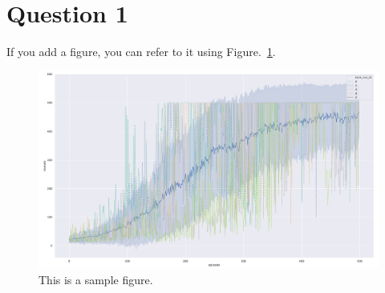 \documentclass[12pt]{article}
\begin{document}
\section{Question 1}

If you add a figure, you can refer to it using Figure.~\ref*{fig:fig1}.

\begin{figure}[h] 
	\centering  %
    \includegraphics[width=0.9\columnwidth]{img/training.pdf}
	\caption{This is a sample figure.}
	\label{fig:fig1}
\end{figure}


\end{document}
